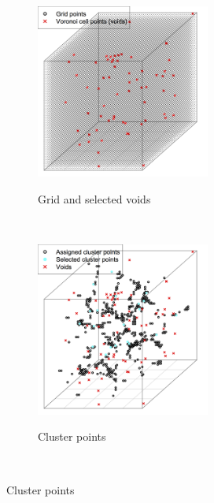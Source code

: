\documentclass[12pt]{article}
\begin{document}
\begin{figure}[t!]
    \centering
    \begin{subfigure}[t]{0.5\textwidth}
        \centering
                \caption{Grid and selected voids}
        \includegraphics[height=2.25in]{fig_vf_grid.png}
 \label{subfig:grid}
    \end{subfigure}%
    ~
    \begin{subfigure}[t]{0.5\textwidth}
        \centering
                \caption{Cluster points}
        \includegraphics[height=2.25in]{fig_vf_cluster.png}
 \label{subfig:cluster}
    \end{subfigure} \\


\end{figure}
\end{document}
